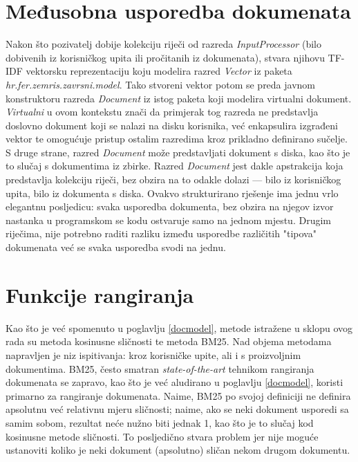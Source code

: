 \documentclass[times, utf8, zavrsni, numeric]{fer}
\begin{document}
\section{Međusobna usporedba dokumenata}
Nakon što pozivatelj dobije kolekciju riječi od razreda \textit{InputProcessor} (bilo dobivenih iz korisničkog upita ili pročitanih iz dokumenata), stvara njihovu TF-IDF vektorsku reprezentaciju koju modelira razred \textit{Vector} iz paketa \textit{hr.fer.zemris.zavrsni.model}. Tako stvoreni vektor potom se preda javnom konstruktoru razreda \textit{Document} iz istog paketa koji modelira virtualni dokument. \textit{Virtualni} u ovom kontekstu znači da primjerak tog razreda ne predstavlja doslovno dokument koji se nalazi na disku korisnika, već enkapsulira izgrađeni vektor te omogućuje pristup ostalim razredima kroz prikladno definirano sučelje. S druge strane, razred \textit{Document} može predstavljati dokument s diska, kao što je to slučaj s dokumentima iz zbirke. Razred \textit{Document} jest dakle apstrakcija koja predstavlja kolekciju riječi, bez obzira na to odakle dolazi — bilo iz korisničkog upita, bilo iz dokumenta s diska. Ovakvo strukturirano rješenje ima jednu vrlo elegantnu posljedicu: svaka usporedba dokumenta, bez obzira na njegov izvor nastanka u programskom se kodu ostvaruje samo na jednom mjestu. Drugim riječima, nije potrebno raditi razliku između usporedbe različitih "tipova" dokumenata već se svaka usporedba svodi na jednu.

\section{Funkcije rangiranja}
Kao što je već spomenuto u poglavlju \ref{docmodel}, metode istražene u sklopu ovog rada su metoda kosinusne sličnosti te metoda BM25.
Nad objema metodama napravljen je niz ispitivanja: kroz korisničke upite, ali i s proizvoljnim dokumentima. BM25, često smatran \textit{state-of-the-art} tehnikom rangiranja dokumenata se zapravo, kao što je već aludirano u poglavlju \ref{docmodel}, koristi primarno za rangiranje dokumenata. Naime, BM25 po svojoj definiciji ne definira apsolutnu već relativnu mjeru sličnosti; naime, ako se neki dokument usporedi sa samim sobom, rezultat neće nužno biti jednak 1, kao što je to slučaj kod kosinusne metode sličnosti. To posljedično stvara problem jer nije moguće ustanoviti koliko je neki dokument (apsolutno) sličan nekom drugom dokumentu.
\end{document}
